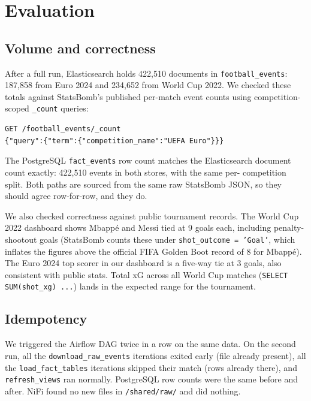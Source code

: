 \documentclass[conference]{IEEEtran}
\begin{document}
\section{Evaluation}

\subsection{Volume and correctness}

After a full run, Elasticsearch holds 422{,}510 documents in
\texttt{football\_events}: 187{,}858 from Euro 2024 and 234{,}652 from World
Cup 2022. We checked these totals against StatsBomb's published per-match
event counts using competition-scoped \texttt{\_count} queries:

\begin{lstlisting}
GET /football_events/_count
{"query":{"term":{"competition_name":"UEFA Euro"}}}
\end{lstlisting}

The PostgreSQL \texttt{fact\_events} row count matches the Elasticsearch
document count exactly: 422{,}510 events in both stores, with the same per-
competition split. Both paths are sourced from the same raw StatsBomb JSON, so
they should agree row-for-row, and they do.

We also checked correctness against public tournament records. The World Cup
2022 dashboard shows Mbapp\'e and Messi tied at 9 goals each, including
penalty-shootout goals (StatsBomb counts these under \texttt{shot\_outcome =
'Goal'}, which inflates the figures above the official FIFA Golden Boot
record of 8 for Mbapp\'e). The Euro 2024 top scorer in our dashboard is a
five-way tie at 3 goals, also consistent with public stats. Total xG
across all World Cup matches (\texttt{SELECT SUM(shot\_xg) ...}) lands in the
expected range for the tournament.

\subsection{Idempotency}

We triggered the Airflow DAG twice in a row on the same data. On the second
run, all the \texttt{download\_raw\_events} iterations exited early (file
already present), all the \texttt{load\_fact\_tables} iterations skipped their
match (rows already there), and \texttt{refresh\_views} ran normally.
PostgreSQL row counts were the same before and after. NiFi found no new files
in \texttt{/shared/raw/} and did nothing.
\end{document}
